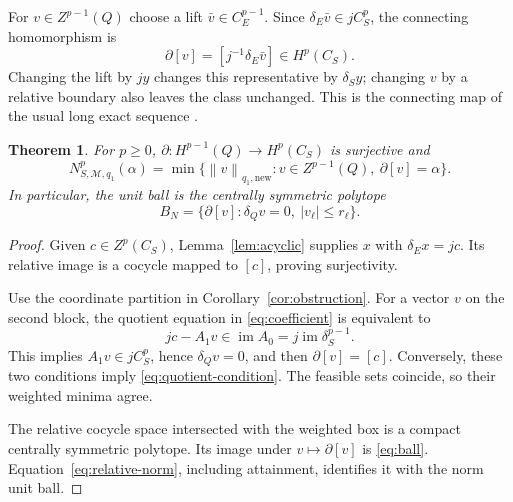 \documentclass[11pt,a4paper]{article}
\numberwithin{equation}{section}
\newtheorem{theorem}{Theorem}[section]
\theoremstyle{remark}
\newcommand{\M}{\mathcal M}
\newcommand{\im}{\operatorname{im}}
\newcommand{\norm}[1]{\left\lVert #1\right\rVert}
\begin{document}
For $v\in Z^{p-1}(Q)$ choose a lift $\bar v\in C_E^{p-1}$. Since $\delta_E\bar v\in jC_S^p$, the connecting homomorphism is
\begin{equation}\label{eq:connecting}
 \partial[v]=[j^{-1}\delta_E\bar v]\in H^p(C_S).
\end{equation}
Changing the lift by $jy$ changes this representative by $\delta_Sy$; changing $v$ by a relative boundary also leaves the class unchanged. This is the connecting map of the usual long exact sequence \cite[Tag~0117]{Stacks}.

\begin{theorem}\label{thm:relative}
For $p\ge0$, $\partial:H^{p-1}(Q)\to H^p(C_S)$ is surjective and
\begin{equation}\label{eq:relative-norm}
 N^p_{S,\M,q_1}(\alpha)=
 \min\{\norm{v}_{q_1,\mathrm{new}}:v\in Z^{p-1}(Q),\ \partial[v]=\alpha\}.
\end{equation}
In particular, the unit ball is the centrally symmetric polytope
\begin{equation}\label{eq:ball}
 B_N=\{\partial[v]:\delta_Qv=0,\ |v_\ell|\le r_\ell\}.
\end{equation}
\end{theorem}
\begin{proof}
Given $c\in Z^p(C_S)$, Lemma~\ref{lem:acyclic} supplies $x$ with $\delta_Ex=jc$. Its relative image is a cocycle mapped to $[c]$, proving surjectivity.

Use the coordinate partition in Corollary~\ref{cor:obstruction}. For a vector $v$ on the second block, the quotient equation in \eqref{eq:coefficient} is equivalent to
\begin{equation}\label{eq:quotient-condition}
 jc-A_1v\in\im A_0=j\im\delta_S^{p-1}.
\end{equation}
This implies $A_1v\in jC_S^p$, hence $\delta_Qv=0$, and then $\partial[v]=[c]$. Conversely, these two conditions imply \eqref{eq:quotient-condition}. The feasible sets coincide, so their weighted minima agree.

The relative cocycle space intersected with the weighted box is a compact centrally symmetric polytope. Its image under $v\mapsto\partial[v]$ is \eqref{eq:ball}. Equation~\eqref{eq:relative-norm}, including attainment, identifies it with the norm unit ball.
\end{proof}
\end{document}
